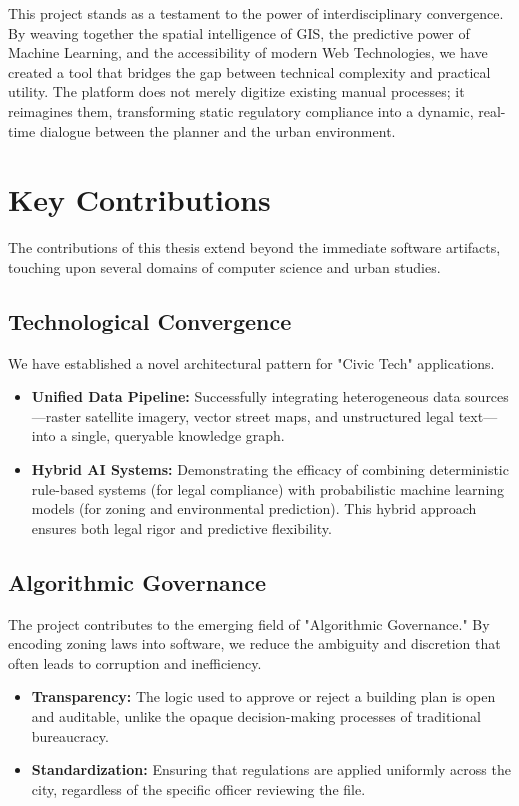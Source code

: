 \documentclass[12pt,a4paper]{report}
\begin{document}
This project stands as a testament to the power of interdisciplinary convergence. By weaving together the spatial intelligence of GIS, the predictive power of Machine Learning, and the accessibility of modern Web Technologies, we have created a tool that bridges the gap between technical complexity and practical utility. The platform does not merely digitize existing manual processes; it reimagines them, transforming static regulatory compliance into a dynamic, real-time dialogue between the planner and the urban environment.

\section{Key Contributions}
The contributions of this thesis extend beyond the immediate software artifacts, touching upon several domains of computer science and urban studies.

\subsection{Technological Convergence}
We have established a novel architectural pattern for "Civic Tech" applications.
\begin{itemize}
    \item \textbf{Unified Data Pipeline:} Successfully integrating heterogeneous data sources—raster satellite imagery, vector street maps, and unstructured legal text—into a single, queryable knowledge graph.
    \item \textbf{Hybrid AI Systems:} Demonstrating the efficacy of combining deterministic rule-based systems (for legal compliance) with probabilistic machine learning models (for zoning and environmental prediction). This hybrid approach ensures both legal rigor and predictive flexibility.
\end{itemize}

\subsection{Algorithmic Governance}
The project contributes to the emerging field of "Algorithmic Governance." By encoding zoning laws into software, we reduce the ambiguity and discretion that often leads to corruption and inefficiency.
\begin{itemize}
    \item \textbf{Transparency:} The logic used to approve or reject a building plan is open and auditable, unlike the opaque decision-making processes of traditional bureaucracy.
    \item \textbf{Standardization:} Ensuring that regulations are applied uniformly across the city, regardless of the specific officer reviewing the file.
\end{itemize}
\end{document}
